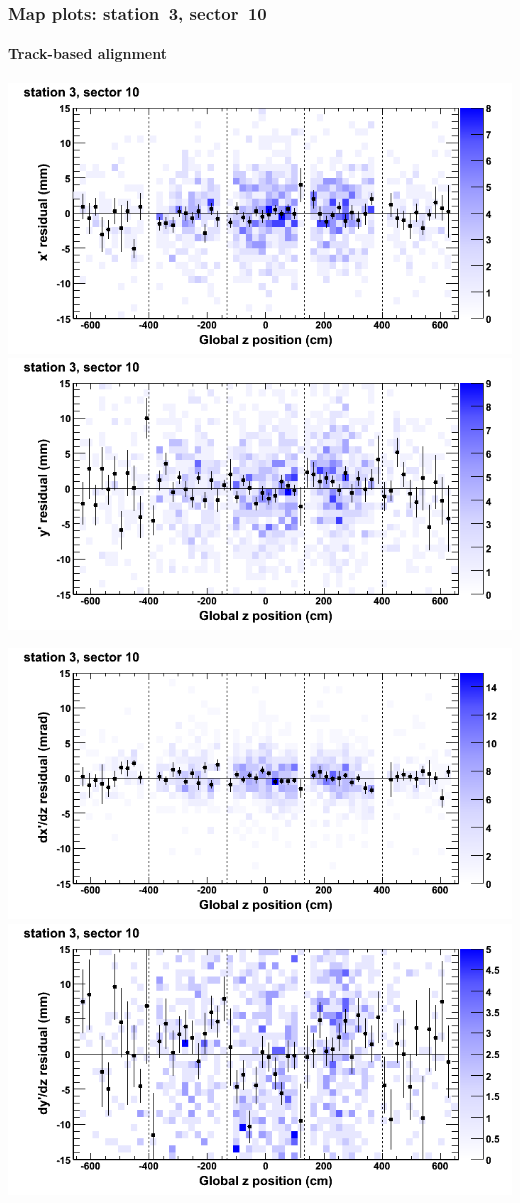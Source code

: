 \documentclass[compress]{beamer}
\begin{document}
\begin{frame}
\frametitle{Map plots: station~3, sector~10}
\framesubtitle{Track-based alignment}
\includegraphics[width=0.5\linewidth]{mapplots_re05/DTvsz_st3sec10_x.png}
\includegraphics[width=0.5\linewidth]{mapplots_re05/DTvsz_st3sec10_y.png}

\includegraphics[width=0.5\linewidth]{mapplots_re05/DTvsz_st3sec10_dxdz.png}
\includegraphics[width=0.5\linewidth]{mapplots_re05/DTvsz_st3sec10_dydz.png}
\end{frame}
\end{document}
